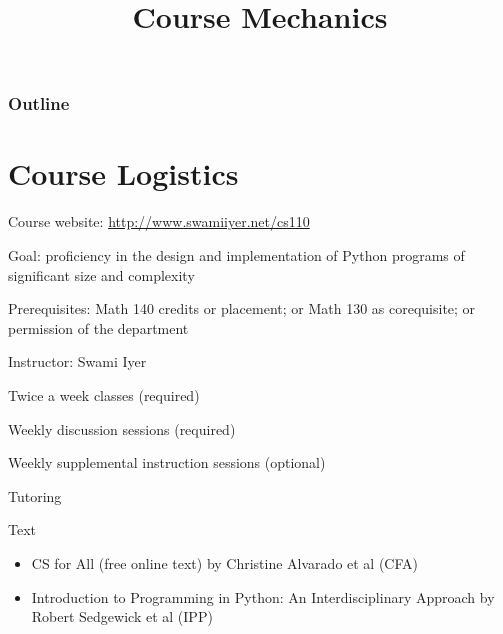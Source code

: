 \documentclass[8pt,a4paper,compress]{beamer}
\title{Course Mechanics}
\date{}
\begin{document}
\begin{frame}
\vfill
\titlepage
\end{frame}

\begin{frame}
\frametitle{Outline}
\tableofcontents
\end{frame}

\section{Course Logistics}
\begin{frame}[fragile]
\pause

Course website: \href{http://www.swamiiyer.net/cs110}{http://www.swamiiyer.net/cs110 \ExternalLink}

\pause
\bigskip

Goal: proficiency in the design and implementation of Python programs of significant size and complexity

\pause
\bigskip

Prerequisites: Math 140 credits or placement; or Math 130 as corequisite; or permission of the department

\pause
\bigskip

Instructor: Swami Iyer

\pause
\bigskip

Twice a week classes (required)

\pause
\bigskip

Weekly discussion sessions (required)

\pause
\bigskip

Weekly supplemental instruction sessions (optional)

\pause
\bigskip

Tutoring

\pause
\bigskip

Text
\begin{itemize}
\item CS for All (free online text) by Christine Alvarado et al (CFA)
\item Introduction to Programming in Python: An Interdisciplinary Approach by Robert Sedgewick et al (IPP)
\end{itemize}
\end{frame}
\end{document}
